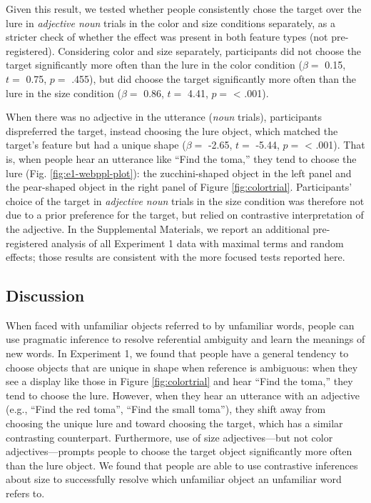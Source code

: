 \documentclass[
  english,
  man,floatsintext]{apa6}
\begin{document}
Given this result, we tested whether people consistently chose the target over the lure in \emph{adjective noun} trials in the color and size conditions separately, as a stricter check of whether the effect was present in both feature types (not pre-registered). Considering color and size separately, participants did not choose the target significantly more often than the lure in the color condition (\(\beta =\) 0.15, \(t =\) 0.75, \(p =\) .455), but did choose the target significantly more often than the lure in the size condition (\(\beta =\) 0.86, \(t =\) 4.41, \(p =\) \textless{} .001).

When there was no adjective in the utterance (\emph{noun} trials), participants dispreferred the target, instead choosing the lure object, which matched the target's feature but had a unique shape (\(\beta =\) -2.65, \(t =\) -5.44, \(p =\) \textless{} .001). That is, when people hear an utterance like ``Find the toma,'' they tend to choose the lure (Fig. \ref{fig:e1-webppl-plot}): the zucchini-shaped object in the left panel and the pear-shaped object in the right panel of Figure \ref{fig:colortrial}. Participants' choice of the target in \emph{adjective noun} trials in the size condition was therefore not due to a prior preference for the target, but relied on contrastive interpretation of the adjective. In the Supplemental Materials, we report an additional pre-registered analysis of all Experiment 1 data with maximal terms and random effects; those results are consistent with the more focused tests reported here.

\hypertarget{discussion}{%
\subsection{Discussion}\label{discussion}}

When faced with unfamiliar objects referred to by unfamiliar words, people can use pragmatic inference to resolve referential ambiguity and learn the meanings of new words. In Experiment 1, we found that people have a general tendency to choose objects that are unique in shape when reference is ambiguous: when they see a display like those in Figure \ref{fig:colortrial} and hear ``Find the toma,'' they tend to choose the lure. However, when they hear an utterance with an adjective (e.g., ``Find the red toma'', ``Find the small toma''), they shift away from choosing the unique lure and toward choosing the target, which has a similar contrasting counterpart. Furthermore, use of size adjectives---but not color adjectives---prompts people to choose the target object significantly more often than the lure object. We found that people are able to use contrastive inferences about size to successfully resolve which unfamiliar object an unfamiliar word refers to.
\end{document}
